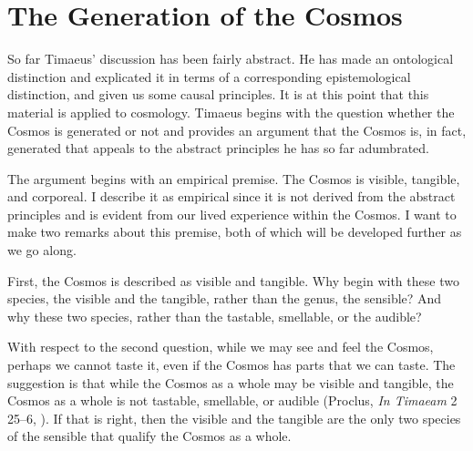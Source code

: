 
\section{The Generation of the Cosmos} %
\label{sec:the_generation_of_the_cosmos}

So far Timaeus' discussion has been fairly abstract. He has made an ontological distinction and explicated it in terms of a corresponding epistemological distinction, and given us some causal principles. It is at this point that this material is applied to cosmology. Timaeus begins with the question whether the Cosmos is generated or not and provides an argument that the Cosmos is, in fact, generated that appeals to the abstract principles he has so far adumbrated.

The argument begins with an empirical premise. The Cosmos is visible, tangible, and corporeal. I describe it as empirical since it is not derived from the abstract principles and is evident from our lived experience within the Cosmos. I want to make two remarks about this premise, both of which will be developed further as we go along.

First, the Cosmos is described as visible and tangible. Why begin with these two species, the visible and the tangible, rather than the genus, the sensible? And why these two species, rather than the tastable, smellable, or the audible? 

With respect to the second question, while we may see and feel the Cosmos, perhaps we cannot taste it, even if the Cosmos has parts that we can taste. The suggestion is that while the Cosmos as a whole may be visible and tangible, the Cosmos as a whole is not tastable, smellable, or audible (Proclus, \emph{In Timaeam} 2 25--6, \citealt{Diehl:1903re}). If that is right, then the visible and the tangible are the only two species of the sensible that qualify the Cosmos as a whole.

